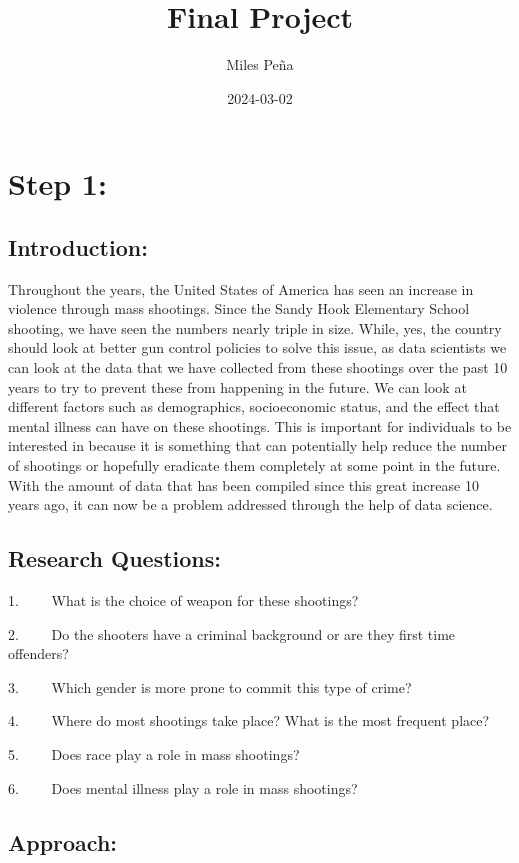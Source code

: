 \documentclass[
]{article}
\title{Final Project}
\author{Miles Peña}
\date{2024-03-02}
\begin{document}
\maketitle

\section{Step 1:}\label{step-1}

\subsection{Introduction:}\label{introduction}

Throughout the years, the United States of America has seen an increase
in violence through mass shootings. Since the Sandy Hook Elementary
School shooting, we have seen the numbers nearly triple in size. While,
yes, the country should look at better gun control policies to solve
this issue, as data scientists we can look at the data that we have
collected from these shootings over the past 10 years to try to prevent
these from happening in the future. We can look at different factors
such as demographics, socioeconomic status, and the effect that mental
illness can have on these shootings. This is important for individuals
to be interested in because it is something that can potentially help
reduce the number of shootings or hopefully eradicate them completely at
some point in the future. With the amount of data that has been compiled
since this great increase 10 years ago, it can now be a problem
addressed through the help of data science.

\subsection{Research Questions:}\label{research-questions}

1.~~~~ What is the choice of weapon for these shootings?

2.~~~~ Do the shooters have a criminal background or are they first time
offenders?

3.~~~~ Which gender is more prone to commit this type of crime?

4.~~~~ Where do most shootings take place? What is the most frequent
place?

5.~~~~ Does race play a role in mass shootings?

6.~~~~ Does mental illness play a role in mass shootings?

\subsection{Approach:}\label{approach}
\end{document}
